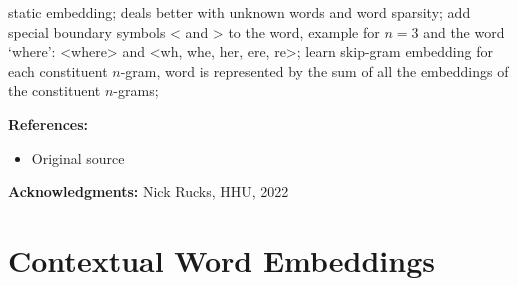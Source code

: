 \documentclass[11pt, a4paper]{amsart}
\begin{document}
{
\color{blue}

static embedding;
deals better with unknown words and word sparsity;
add special boundary symbols < and > to the word,
example for $n=3$ and the word `where':
<where> and <wh, whe, her, ere, re>;
learn skip-gram embedding for each constituent $n$-gram, word is represented by the sum of all the embeddings of the constituent $n$-grams;
}

\noindent \textbf{References:}
\begin{itemize}
	\item Original source \cite{DBLP:journals/corr/BojanowskiGJM16}
\end{itemize}

{
\color{gray}

\noindent \textbf{Acknowledgments:} Nick Rucks, HHU, 2022
}

\section{Contextual Word Embeddings}
\label{sec:contextual_word_embeddings}
\end{document}
